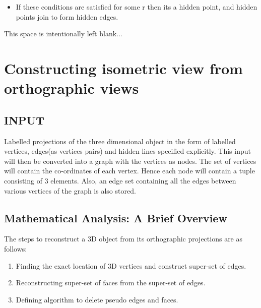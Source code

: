 \documentclass[12pt]{article}
\begin{document}
\begin{itemize}
\begin{itemize}
\begin{itemize}
	    \end{itemize}
	     
    \end{itemize}
    \bigskip
    \item If these conditions are satisfied for some r then its a hidden point, and hidden points join to form hidden edges.
    
    


\end{itemize}

\bigskip
\bigskip
\bigskip
\bigskip
\bigskip
\bigskip
\bigskip
\bigskip
\bigskip
\bigskip
\bigskip
\bigskip
\bigskip
\bigskip
\bigskip
\bigskip
\bigskip
\bigskip

\begin{center}
    This space is intentionally left blank...
\end{center}

\pagebreak{}

\section{Constructing isometric view from orthographic views}

\subsection{INPUT}
Labelled projections of the three dimensional object in the form of labelled vertices, edges(as vertices pairs) and hidden lines specified explicitly. This input will then be converted into a graph with the vertices as nodes. The set of vertices will contain the co-ordinates of each vertex. Hence each node will contain a tuple consisting of 3 elements. Also, an edge set containing all the edges between various vertices of the graph is also stored.
\bigskip

\subsection{Mathematical Analysis: A Brief Overview}

The steps to reconstruct a 3D object from its orthographic projections are as follows:

\begin{enumerate}

    \item Finding the exact location of 3D vertices and construct super-set of  edges.
    \item Reconstructing super-set of faces from the super-set of edges.
    \item Defining algorithm to delete pseudo edges and faces.
    
\end{enumerate}
\bigskip
\end{document}
